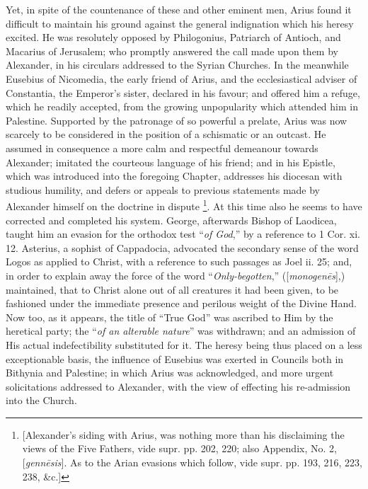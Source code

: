 Yet, in spite of the countenance of these and other eminent men,
Arius found it difficult to maintain his ground against the general
indignation which his heresy excited. He was resolutely opposed by
Philogonius, Patriarch of Antioch, and Macarius of Jerusalem; who
promptly answered the call made upon them by Alexander, in his
circulars addressed to the Syrian Churches. In the meanwhile Eusebius
of Nicomedia, the early friend of Arius, and the ecclesiastical
adviser of Constantia, the Emperor's sister, declared in his favour;
and offered him a refuge, which he readily accepted, from the growing
unpopularity which attended him in Palestine. Supported by the
patronage of so powerful a prelate, Arius was now scarcely to be
considered in the position of a schismatic or an outcast. He assumed
in consequence a more calm and respectful demeanour towards Alexander;
imitated the courteous language of his friend; and in his Epistle,
which was introduced into the foregoing Chapter, addresses his
diocesan with studious humility, and defers or appeals to previous
statements made by Alexander himself on the doctrine in dispute \footnote{[Alexander's siding with Arius, was nothing
more than his disclaiming the views of the Five Fathers, vide supr.
pp. 202, 220; also Appendix, No. 2, [\emph{genn\={e}sis}]. As to
the Arian evasions which follow, vide supr. pp. 193, 216, 223, 238,
\&c.]}. At this time also he seems to have corrected and completed his
system. George, afterwards Bishop of Laodicea, taught him an evasion
for the orthodox test ``\emph{of God},'' by a reference to 1
Cor. xi. 12. Asterius, a sophist of Cappadocia, advocated the
secondary sense of the word Logos as applied to Christ, with a
reference to such passages as Joel ii. 25; and, in order to explain
away the force of the word ``\emph{Only-begotten},'' ([\emph{monogen\={e}s}],)
maintained, that to Christ alone out of all creatures it had been
given, to be fashioned under the immediate presence and perilous
weight of the Divine Hand. Now too, as it appears, the title of
``True God'' was ascribed to Him by the heretical party; the
``\emph{of an alterable nature}'' was withdrawn; and an
admission of His actual indefectibility substituted for it. The heresy
being thus placed on a less exceptionable basis, the influence of
Eusebius was exerted in Councils both in Bithynia and Palestine; in
which Arius was acknowledged, and more urgent solicitations addressed
to Alexander, with the view of effecting his re-admission into the
Church.

